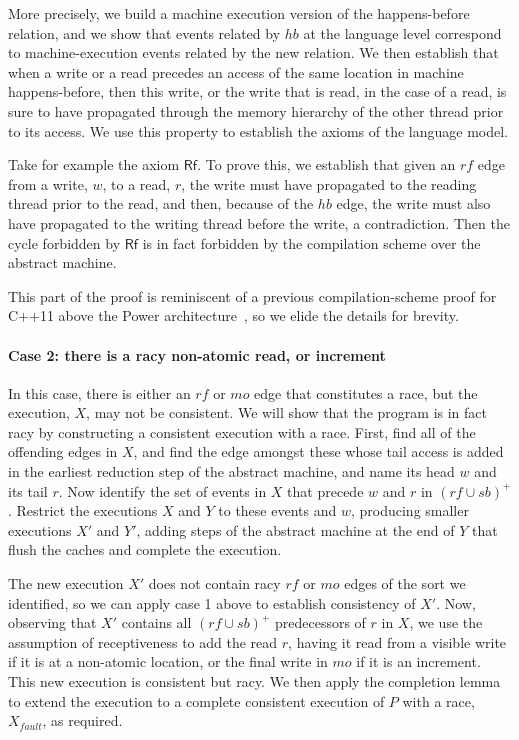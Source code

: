 \documentclass[svgnames,10pt]{sigplanconf}
\theoremstyle{definition}
\newcommand\axiom[1]{\textsf{#1}}
\newcommand\var[1]{\mathit{#1}}
\newcommand\Sb{\var{sb}}
\newcommand\rf{\var{rf}}
\newcommand\mo{\var{mo}}
\newcommand\hb{\var{hb}}
\begin{document}
More precisely, we build a machine execution version of the
happens-before relation, and we show that events related by $\hb$ at
the language level correspond to machine-execution events related by
the new relation. We then establish that when a write or a read
precedes an access of the same location in machine happens-before,
then this write, or the write that is read, in the case of a read, is
sure to have propagated through the memory hierarchy of the
other thread prior to its access. We use this property to establish
the axioms of the language model.

Take for example the axiom $\axiom{Rf}$. To prove this, we
establish that given an $\rf$ edge from a write, $w$, to a read, $r$,
the write must have propagated to the reading thread prior to the
read, and then, because of the $\hb$ edge, the write must also have
propagated to the writing thread before the write, a contradiction.
Then the cycle forbidden by $\axiom{Rf}$ is in fact forbidden
by the compilation scheme over the abstract machine.

This part of the proof is reminiscent of a previous
compilation-scheme proof for C++11 above the Power
architecture~\cite{Sarkar:2012:SCP:2254064.2254102}, so we elide the
details for brevity.




\paragraph{Case 2: there is a racy non-atomic read, or increment}
In this case, there is either an $\rf$ or $\mo$ edge that constitutes
a race, but the execution, $X$, may not be consistent. We will show
that the program is in fact racy by constructing a consistent
execution with a race.
%
First, find all of the offending edges in $X$, and find the edge
amongst these whose tail access is added in the earliest reduction
step of the abstract machine, and name its head $w$ and its tail
$r$. Now identify the set of events in $X$ that precede $w$ and $r$ in
$(\rf \cup \Sb)^+$. Restrict the executions $X$ and $Y$ to these
events and $w$, producing smaller executions $X'$ and $Y'$, adding
steps of the abstract machine at the end of $Y$ that flush the caches
and complete the execution.

The new execution $X'$ does not contain racy $\rf$ or $\mo$ edges of
the sort we identified, so we can apply case 1 above to establish
consistency of $X'$. Now, observing that $X'$ contains all
$(\rf \cup \Sb)^+$ predecessors of $r$ in $X$, we use the assumption
of receptiveness to add the read $r$, having it read from a visible
write if it is at a non-atomic location, or the final write in $\mo$
if it is an increment. This new execution is consistent but racy. We
then apply the completion lemma to extend the execution to a
complete consistent execution of $P$ with a race, $X_{\var{fault}}$,
as required.
\end{document}
